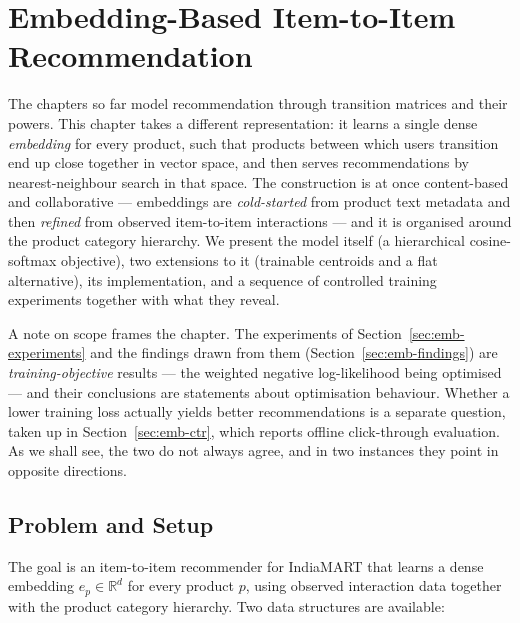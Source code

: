 \chapter{Embedding-Based Item-to-Item Recommendation}
\label{ch:embedding}

The chapters so far model recommendation through transition matrices and their
powers. This chapter takes a different representation: it learns a single dense
\emph{embedding} for every product, such that products between which users
transition end up close together in vector space, and then serves
recommendations by nearest-neighbour search in that space. The construction is
at once content-based and collaborative --- embeddings are \emph{cold-started}
from product text metadata and then \emph{refined} from observed item-to-item
interactions --- and it is organised around the product category hierarchy. We
present the model itself (a hierarchical cosine-softmax objective), two
extensions to it (trainable centroids and a flat alternative), its
implementation, and a sequence of controlled training experiments together with
what they reveal.

A note on scope frames the chapter. The experiments of
Section~\ref{sec:emb-experiments} and the findings drawn from them
(Section~\ref{sec:emb-findings}) are \emph{training-objective} results --- the
weighted negative log-likelihood being optimised --- and their conclusions are
statements about optimisation behaviour. Whether a lower training loss actually
yields better recommendations is a separate question, taken up in
Section~\ref{sec:emb-ctr}, which reports offline click-through evaluation. As we
shall see, the two do not always agree, and in two instances they point in
opposite directions.

\section{Problem and Setup}
\label{sec:emb-problem}

The goal is an item-to-item recommender for IndiaMART that learns a dense
embedding $e_p \in \mathbb{R}^{d}$ for every product $p$, using observed
interaction data together with the product category hierarchy. Two data
structures are available:

